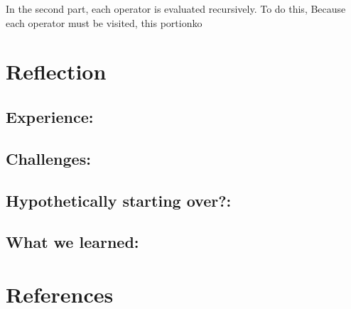 \documentclass[11pt]{article}
\begin{document}
In the second part, each operator is evaluated recursively.
To do this,
Because each operator must be visited, this portionko

\section*{Reflection}

\subsection*{Experience:}

\subsection*{Challenges:}

\subsection*{Hypothetically starting over?:}

\subsection*{What we learned:}

\section*{References}
\end{document}
